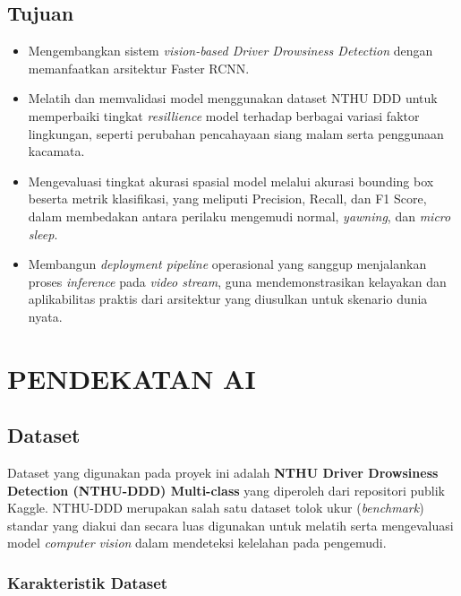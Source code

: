 \documentclass[11pt,a4paper,oneside]{report}
\begin{document}
\section{Tujuan}
\begin{itemize}
\item Mengembangkan sistem \textit{vision-based Driver Drowsiness Detection} dengan memanfaatkan arsitektur Faster RCNN.
\item Melatih dan memvalidasi model menggunakan dataset NTHU DDD untuk memperbaiki tingkat \textit{resillience} model terhadap berbagai variasi faktor lingkungan, seperti perubahan pencahayaan siang malam serta penggunaan kacamata.
\item Mengevaluasi tingkat akurasi spasial model melalui akurasi bounding box beserta metrik klasifikasi, yang meliputi Precision, Recall, dan F1 Score, dalam membedakan antara perilaku mengemudi normal, \textit{yawning}, dan \textit{micro sleep}.
\item Membangun \textit{deployment pipeline} operasional yang sanggup menjalankan proses \textit{inference} pada \textit{video stream}, guna mendemonstrasikan kelayakan dan aplikabilitas praktis dari arsitektur yang diusulkan untuk skenario dunia nyata.
\end{itemize}


\chapter{PENDEKATAN AI}

\section{Dataset}

Dataset yang digunakan pada proyek ini adalah \textbf{NTHU Driver Drowsiness Detection (NTHU-DDD) Multi-class} yang diperoleh dari repositori publik Kaggle. NTHU-DDD merupakan salah satu dataset tolok ukur (\textit{benchmark}) standar yang diakui dan secara luas digunakan untuk melatih serta mengevaluasi model \textit{computer vision} dalam mendeteksi kelelahan pada pengemudi. 

\subsection{Karakteristik Dataset}
\end{document}
